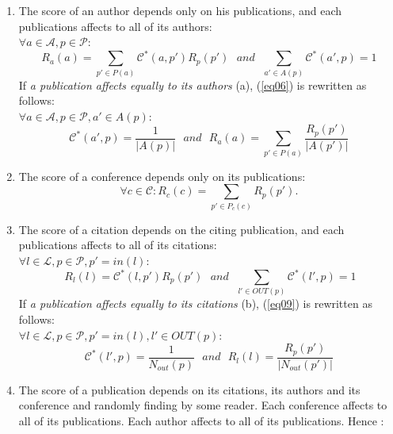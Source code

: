 \documentclass[10pt,leqno,twoside]{article}
\begin{document}
\begin{enumerate}
\item The score of an author depends only on his publications, and each publications affects to all of its authors: \\
$\forall a\in\mathcal{A},p\in\mathcal{P}:$
\begin{equation}\label{eq06}
R_a(a) = \sum_{p'\in P(a)} \mathcal{C}^*(a,p')R_p(p') ~~~and~~~\sum_{a'\in A(p)}\mathcal{C}^*(a',p)=1
\end{equation}
If \textit{a publication affects equally to its authors} (a), (\ref{eq06}) is rewritten as follows:\\
$\forall a\in\mathcal{A},p\in\mathcal{P}, a'\in A(p):$
\begin{equation}\label{eq07}
\mathcal{C}^*(a',p)= \frac{1}{|A(p)|}  ~~~and~~~ R_a(a) = \sum_{p'\in P(a)} \frac{R_p(p')}{|A(p')|}
\end{equation}
\item The score of a conference depends only on its publications:
\begin{equation}\label{eq08}
\forall c\in\mathcal{C}: R_c(c) = \sum_{p'\in P_c(c)} R_p(p').
\end{equation}

\item The score of a citation depends on the citing publication, and each publications affects to all of its citations: \\
$ \forall l\in\mathcal{L}, p \in \mathcal{P}, p'=in(l):$
\begin{equation}\label{eq09}
 ~R_l(l) =  \mathcal{C}^*(l,p')R_p(p') ~~~and ~~~ \sum_{l'\in OUT(p)}\mathcal{C}^*(l',p)=1
\end{equation}
If \textit{a publication affects equally to its citations} (b), (\ref{eq09}) is rewritten as follows:\\
$\forall l\in\mathcal{L}, p \in \mathcal{P}, p'=in(l), l'\in OUT(p):$
\begin{equation}\label{eq10}
 \mathcal{C}^*(l',p)= \frac{1}{N_{out}(p)} ~~~and~~~ R_l(l) =  \frac{R_p(p')}{|N_{out}(p')|}
\end{equation}
\item  The score of a publication depends on its citations, its authors and its conference and randomly finding by some reader. Each conference affects to all of its publications. Each author affects to all of its publications. Hence :


\end{enumerate}
\end{document}
